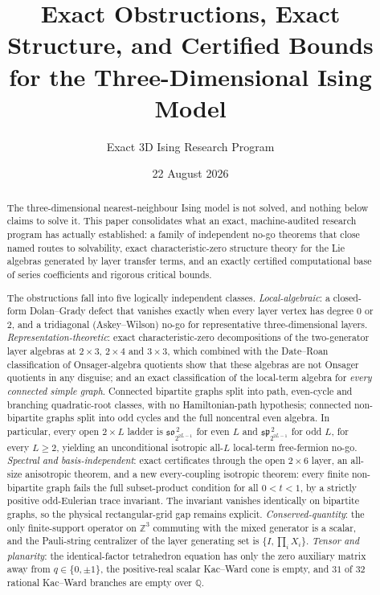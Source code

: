 \documentclass[11pt]{article}
\title{Exact Obstructions, Exact Structure, and Certified Bounds\\
for the Three-Dimensional Ising Model}
\author{Exact 3D Ising Research Program}
\date{22 August 2026}
\theoremstyle{definition}
\newcommand{\Qb}{\mathbb{Q}}
\newcommand{\Zb}{\mathbb{Z}}
\begin{document}
\maketitle

\begin{abstract}
The three-dimensional nearest-neighbour Ising model is not solved, and nothing below claims to solve
it. This paper consolidates what an exact, machine-audited research program has actually established:
a family of independent no-go theorems that close named routes to solvability, exact
characteristic-zero structure theory for the Lie algebras generated by layer transfer terms, and an
exactly certified computational base of series coefficients and rigorous critical bounds.

The obstructions fall into five logically independent classes. \emph{Local-algebraic}: a closed-form
Dolan--Grady defect that vanishes exactly when every layer vertex has degree $0$ or $2$, and a
tridiagonal (Askey--Wilson) no-go for representative three-dimensional layers.
\emph{Representation-theoretic}: exact characteristic-zero decompositions of the two-generator layer
algebras at $2\times3$, $2\times4$ and $3\times3$, which combined with the Date--Roan classification
of Onsager-algebra quotients show that these algebras are not Onsager quotients in any disguise; and
an exact classification of the local-term algebra for \emph{every connected simple graph}. Connected
bipartite graphs split into path, even-cycle and branching quadratic-root classes, with no
Hamiltonian-path hypothesis; connected non-bipartite graphs split into odd cycles and the full
noncentral even algebra. In particular, every open $2\times L$ ladder is
$\mathfrak{so}_{2^{2L-1}}^{\,2}$ for even $L$ and
$\mathfrak{sp}_{2^{2L-1}}^{\,2}$ for odd $L$, for every $L\ge2$, yielding an unconditional
isotropic all-$L$ local-term free-fermion no-go. \emph{Spectral and basis-independent}: exact
certificates through the open $2\times6$ layer, an all-size anisotropic theorem, and a new
every-coupling isotropic theorem: every finite non-bipartite graph fails the full subset-product
condition for all $0<t<1$, by a strictly positive odd-Eulerian trace invariant. The invariant
vanishes identically on bipartite graphs, so the physical rectangular-grid gap remains explicit.
\emph{Conserved-quantity}: the only finite-support operator on $\Zb^3$ commuting with the mixed
generator is a scalar, and the Pauli-string centralizer of the layer generating set is
$\{I,\prod_i X_i\}$. \emph{Tensor and planarity}: the identical-factor tetrahedron equation has only
the zero auxiliary matrix away from $q\in\{0,\pm1\}$, the positive-real scalar Kac--Ward cone is
empty, and $31$ of $32$ rational Kac--Ward branches are empty over $\Qb$.


\end{abstract}
\end{document}
